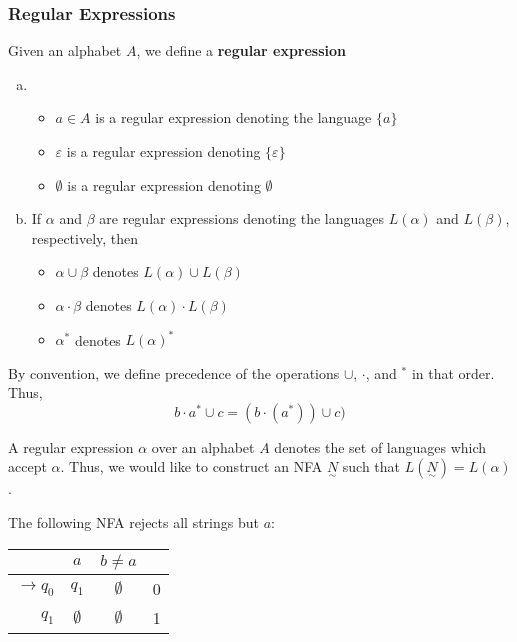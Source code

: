 \subsubsection{Regular Expressions}\label{subsubsec:regular-expressions}
\begin{definition}
Given an alphabet $A$, we define a \textbf{regular expression}
\begin{enumerate}[(a)]
    \item \begin{itemize}
        \item $a\in A$ is a regular expression denoting the language $\{a\}$
        \item $\varepsilon$ is a regular expression denoting $\{\varepsilon\}$
        \item $\emptyset$ is a regular expression denoting $\emptyset$
    \end{itemize}
    
    \item If $\alpha$ and $\beta$ are regular expressions denoting the languages $L(\alpha)$ and $L(\beta)$, respectively, then 
    \begin{itemize}
        \item $\alpha\cup\beta$ denotes $L(\alpha)\cup L(\beta)$
        \item $\alpha\cdot\beta$ denotes $L(\alpha)\cdot L(\beta)$
        \item $\alpha^*$ denotes $L(\alpha)^*$
    \end{itemize}
\end{enumerate}
\end{definition}

By convention, we define precedence of the operations $\cup$, $\cdot$, and $^*$ in that order. Thus, \[b\cdot a^*\cup c=(b\cdot(a^*))\cup c)\]

A regular expression $\alpha$ over an alphabet $A$ denotes the set of languages which accept $\alpha$. Thus, we would like to construct an NFA $\underset{\sim}{N}$ such that $L(\underset{\sim}{N})=L(\alpha)$.

The following NFA rejects all strings but $a$:

\begin{center}\begin{tabular}{r| c c r}
      & $a$ & $b\neq a$ & \\\hline
      $\to q_0$ & $q_1$ & $\emptyset$ & 0\\
            $q_1$ & $\emptyset$ & $\emptyset$ & 1\\
 \end{tabular}\end{center}

